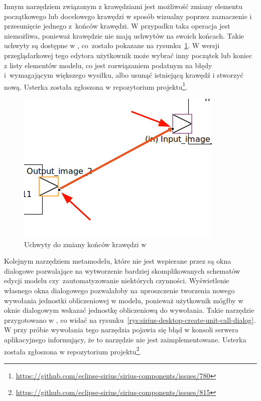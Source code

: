 Innym narzędziem związanym z krawędziami jest możliwość zmiany elementu
początkowego lub docelowego krawędzi w sposób wizualny poprzez zaznaczenie i
przesunięcie jednego z~końców krawędzi. W przypadku \SiriusWeb{} taka
operacja jest niemożliwa, ponieważ krawędzie nie mają uchwytów na swoich
końcach. Takie uchwyty są dostępne w \SiriusDesktop{}, co~zostało pokazane
na rysunku~\ref{rys:sirius-desktop-reconnect-edge}. W wersji
przeglądarkowej tego edytora użytkownik może wybrać inny początek lub koniec
z listy elementów modelu, co jest rozwiązaniem podatnym na błędy i~wymagającym
większego wysiłku, albo usunąć istniejącą krawędź i stworzyć nową.
Usterka została zgłoszona w repozytorium projektu\footnote{
	\url{https://github.com/eclipse-sirius/sirius-components/issues/780}
}.

\begin{figure}[t]
  \centering

  \includegraphics[width=0.5\linewidth]{./images/sirius-desktop-reconnect-edge.png}
  \caption{Uchwyty do zmiany końców krawędzi w \SiriusDesktop{}}\label{rys:sirius-desktop-reconnect-edge}
\end{figure}

Kolejnym narzędziem metamodelu, które nie jest wspierane przez \SiriusWeb{} są
okna dialogowe pozwalające na wytworzenie bardziej
skomplikowanych
schematów edycji modelu czy~zautomatyzowanie niektórych czynności. Wyświetlenie
własnego okna dialogowego pozwalałoby na uproszczenie tworzenia nowego
wywołania jednostki obliczeniowej w modelu, ponieważ użytkownik mógłby w oknie
dialogowym wskazać jednostkę obliczeniową do wywołania. Takie narzędzie
przygotowano w \SiriusDesktop{}, co widać na
rysunku~\ref{rys:sirius-desktop-create-unit-call-dialog}. W \SiriusWeb{} przy
próbie wywołania tego narzędzia pojawia się błąd w konsoli
serwera
aplikacyjnego informujący, że to narzędzie nie jest zaimplementowane. Usterka
została zgłoszona w repozytorium projektu\footnote{
	\url{https://github.com/eclipse-sirius/sirius-components/issues/815}
}.

